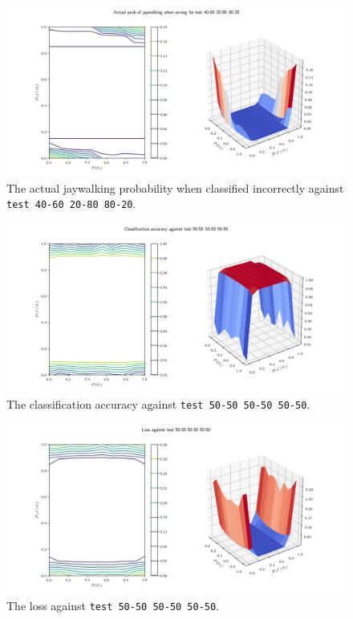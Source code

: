 \documentclass[paper=a4paper]{report}
\newcommand{\code}{\texttt}
\begin{document}
\begin{figure}[h]
    \centering
    \centerline{\includegraphics[scale=0.55]{test_40-60_20-80_80-20_jay_prob.png}}
    \caption[]{The actual jaywalking probability when classified incorrectly against \code{test 40-60 20-80 80-20}.}
    \label{fig:test_40-60_20-80_80-20_jay_prob_plot}
\end{figure}

% 
% 

\begin{figure}[h]
    \centering
    \centerline{\includegraphics[scale=0.55]{test_50-50_50-50_50-50_accuracy.png}}
    \caption[]{The classification accuracy against \code{test 50-50 50-50 50-50}.}
    \label{fig:test_50-50_50-50_50-50_accuracy_plot}
\end{figure}

\begin{figure}[h]
    \centering
    \centerline{\includegraphics[scale=0.55]{test_50-50_50-50_50-50_loss.png}}
    \caption[]{The loss against \code{test 50-50 50-50 50-50}.}
    \label{fig:test_50-50_50-50_50-50_loss_plot}
\end{figure}
\end{document}
